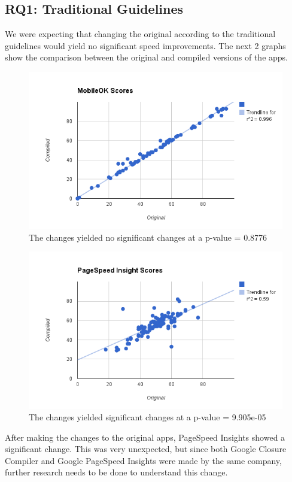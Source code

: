 \documentclass{acm_proc_article-sp}
\begin{document}
\subsection{RQ1: Traditional Guidelines}
We were expecting that changing the original according to the traditional guidelines would yield no significant speed improvements. 
The next 2 graphs show the comparison between the original and compiled versions of the apps.  
\begin{figure}[h!]
    \includegraphics[scale=0.4]{mobileokrq1}
    \caption{The changes yielded no significant changes at a p-value = 0.8776}
\end{figure}

\begin{figure}[h!]
    \includegraphics[scale=0.4]{pagespeedrq1}
    \caption{The changes yielded significant changes at a p-value = 9.905e-05}
\end{figure}

After making the changes to the original apps, PageSpeed Insights showed a significant change. 
This was very unexpected, but since both Google Closure Compiler and Google PageSpeed Insights were made by the same company, further research needs to be done to understand this change.
\end{document}
